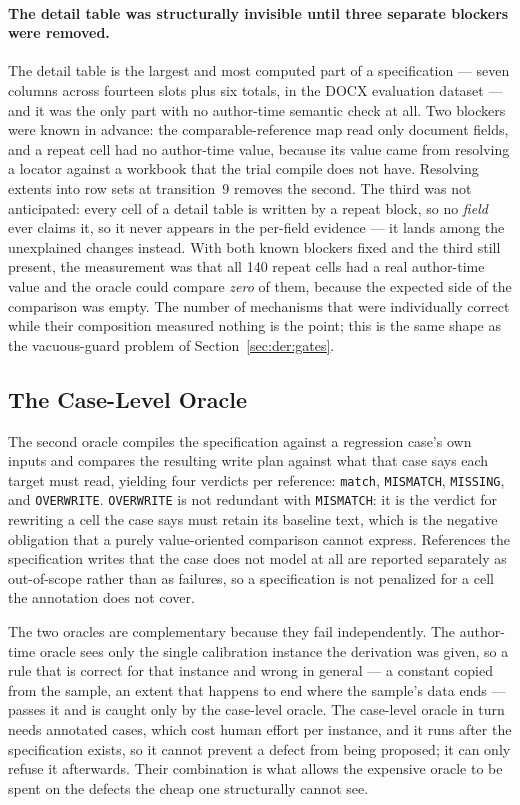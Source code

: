 \paragraph{The detail table was structurally invisible until three separate blockers were removed.}
The detail table is the largest and most computed part of a specification --- seven columns across
fourteen slots plus six totals, in the DOCX evaluation dataset --- and it was the only part with no
author-time semantic check at all. Two blockers were known in advance: the comparable-reference map
read only document fields, and a repeat cell had no author-time value, because its value came from
resolving a locator against a workbook that the trial compile does not have. Resolving extents into
row sets at transition~9 removes the second. The third was not anticipated: every cell of a detail
table is written by a repeat block, so no \emph{field} ever claims it, so it never appears in the
per-field evidence --- it lands among the unexplained changes instead. With both known blockers
fixed and the third still present, the measurement was that all 140 repeat cells had a real
author-time value and the oracle could compare \emph{zero} of them, because the expected side of the
comparison was empty. The number of mechanisms that were individually correct while their
composition measured nothing is the point; this is the same shape as the vacuous-guard problem of
Section~\ref{sec:der:gates}.

\subsection{The Case-Level Oracle}
\label{sec:der:oracles:case}

The second oracle compiles the specification against a regression case's own inputs and compares the
resulting write plan against what that case says each target must read, yielding four verdicts per
reference: \texttt{match}, \texttt{MISMATCH}, \texttt{MISSING}, and \texttt{OVERWRITE}.
\texttt{OVERWRITE} is not redundant with \texttt{MISMATCH}: it is the verdict for rewriting a cell
the case says must retain its baseline text, which is the negative obligation that a purely
value-oriented comparison cannot express. References the specification writes that the case does not
model at all are reported separately as out-of-scope rather than as failures, so a specification is
not penalized for a cell the annotation does not cover.

The two oracles are complementary because they fail independently. The author-time oracle sees only
the single calibration instance the derivation was given, so a rule that is correct for that instance
and wrong in general --- a constant copied from the sample, an extent that happens to end where the
sample's data ends --- passes it and is caught only by the case-level oracle. The case-level oracle
in turn needs annotated cases, which cost human effort per instance, and it runs after the
specification exists, so it cannot prevent a defect from being proposed; it can only refuse it
afterwards. Their combination is what allows the expensive oracle to be spent on the defects the
cheap one structurally cannot see.


